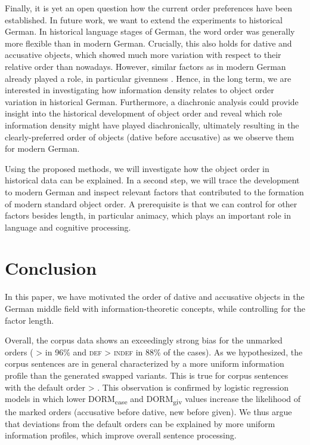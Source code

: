 \documentclass[output=paper,colorlinks,citecolor=brown]{langscibook}
\begin{document}
Finally, it is yet an open question how the current order preferences have been established. In future work, we want to extend the experiments to historical German. In historical language stages of German, the word order was generally more flexible than in modern German. Crucially, this also holds for dative and accusative objects, which showed much more variation with respect to their relative order than nowadays. However, similar factors as in modern German already played a role, in particular givenness \citep{rauth20}. Hence, in the long term, we are interested in investigating how information density relates to object order variation in historical German. Furthermore, a diachronic analysis could provide insight into the historical development of object order and reveal which role information density might have played diachronically, ultimately resulting in the clearly-preferred order of objects (dative before accusative) as we observe them for modern German. 

Using the proposed methods, we will investigate how the object order in historical data can be explained. In a second step, we will trace the development to modern German and inspect relevant factors that contributed to the formation of modern standard object order. A prerequisite is that we can control for other factors besides length, in particular animacy, which plays an important role in language and cognitive processing.

\section{Conclusion}\label{sec:conclusion}

In this paper, we have motivated the order of dative and accusative objects in the German middle field with information-theoretic concepts, while controlling for the factor length.

Overall, the corpus data shows an exceedingly strong bias for the unmarked orders (\ReichDat{} > \ReichAcc{} in 96\% and \textsc{def > indef} in 88\% of the cases). 
As we hypothesized, the corpus sentences are in general characterized by a more uniform information profile than the generated swapped variants. This is true for corpus sentences with the default order \ReichDat{} > \ReichAcc{}. 
This observation is confirmed by logistic regression models in which lower \textnormal{DORM}\textsubscript{case}\xspace and \textnormal{DORM}\textsubscript{giv}\xspace values increase the likelihood of the marked orders (accusative before dative, new before given).
We thus argue that deviations from the default orders can be explained by more uniform information profiles, which improve overall sentence processing.
\end{document}
